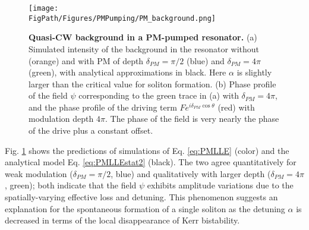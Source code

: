 \begin{figure}[htpb]
	\begin{center}
		\texttt{[image: \\FigPath/Figures/PMPumping/PM\_background.png]}
	\end{center}
	\caption[Quasi-CW background in a PM-pumped resonator]{\textbf{Quasi-CW background in a PM-pumped resonator.} (a) Simulated intensity of the background in the resonator without (orange) and with PM of depth $\delta_{PM}=\pi/2$ (blue) and $\delta_{PM}=4\pi$ (green), with analytical approximations in black. Here $\alpha$ is slightly larger than the critical value for soliton formation. (b) Phase profile of the field $\psi$ corresponding to the green trace in (a) with $\delta_{PM}=4\pi$, and the phase profile of the driving term $Fe^{i\delta_{PM}\cos{\theta}}$ (red) with modulation depth $4\pi$. The phase of the field is very nearly the phase of the drive plus a constant offset.}
	\label{fig:PMbackground}
\end{figure} 

Fig. \ref{fig:PMbackground} shows the predictions of simulations of Eq. \ref{eq:PMLLE} (color) and the analytical model Eq. \ref{eq:PMLLEstat2} (black). The two agree quantitatively for weak modulation ($\delta_{PM}=\pi/2$, blue) and qualitatively with larger depth ($\delta_{PM}=4\pi$, green); both indicate that the field $\psi$ exhibits amplitude variations due to the spatially-varying effective loss and detuning. This phenomenon suggests an explanation for the spontaneous formation of a single soliton as the detuning $\alpha$ is decreased in terms of the local disappearance of Kerr bistability.


